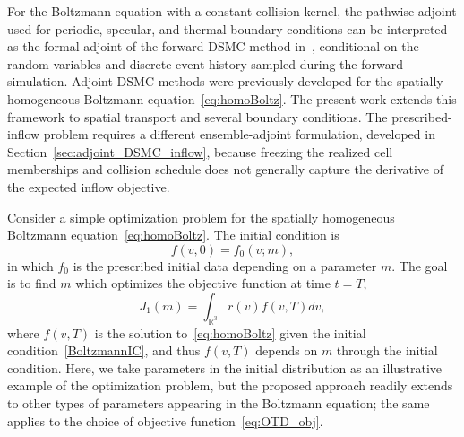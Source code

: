 \documentclass[12pt,nopreprintline]{elsarticle}
\newcommand{\bbR}{\mathbb R} \newcommand{\bbS}{\mathbb S}
\begin{document}
For the Boltzmann equation with a constant collision kernel, the pathwise adjoint used for periodic, specular, and thermal boundary conditions can be interpreted as the formal adjoint of the forward DSMC method in~, conditional on the random variables and discrete event history sampled during the forward simulation. Adjoint DSMC methods were previously developed for the spatially homogeneous Boltzmann equation~\eqref{eq:homoBoltz}. The present work extends this framework to spatial transport and several boundary conditions. The prescribed-inflow problem requires a different ensemble-adjoint formulation, developed in Section~\ref{sec:adjoint_DSMC_inflow}, because freezing the realized cell memberships and collision schedule does not generally capture the derivative of the expected inflow objective.

Consider a simple optimization problem for the spatially homogeneous Boltzmann equation~\eqref{eq:homoBoltz}. The initial condition is
\begin{equation}
f(v,0)=f_0(v;m), \label{BoltzmannIC}
\end{equation}
in which $f_0$ is the prescribed initial data depending on a parameter $m$. The goal is to find $m$ which optimizes the objective function at time $t=T$,
\begin{equation}\label{eq:OTD_obj}
J_1 (m) = \int_{\bbR^3} r(v) f(v,T) dv,
\end{equation}
where $f(v,T)$ is the solution to~\eqref{eq:homoBoltz} given the initial condition~\eqref{BoltzmannIC}, and thus $f(v,T)$ depends on $m$ through the initial condition. Here, we take parameters in the initial distribution as an illustrative example of the optimization problem, but the proposed approach readily extends to other types of parameters appearing in the Boltzmann equation; the same applies to the choice of objective function~\eqref{eq:OTD_obj}.
\end{document}
